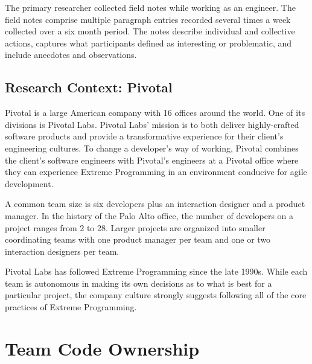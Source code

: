 The primary researcher collected field notes while working as an engineer. The field notes comprise multiple paragraph entries recorded several times a week collected over a six month period. The notes describe individual and collective actions, captures what participants defined as interesting or problematic, and include anecdotes and observations. 

\subsection{Research Context: Pivotal}
\label{ResearchContext}
Pivotal is a large American company with 16 offices around the world. One of its divisions is Pivotal Labs. Pivotal Labs' mission is to both deliver highly-crafted software products and provide a transformative experience for their client's engineering cultures. To change a developer's way of working, Pivotal combines the client's software engineers with Pivotal's engineers at a Pivotal office where they can experience Extreme Programming in an environment conducive for agile development. %

A common team size is six developers plus an interaction designer and a product manager. In the history of the Palo Alto office, the number of developers on a project ranges from 2 to 28. Larger projects are organized into smaller coordinating teams with one product manager per team and one or two interaction designers per team.


Pivotal Labs has followed Extreme Programming \cite{BeckExtremeProgramming2004} since the late 1990s. While each team is autonomous in making its own decisions as to what is best for a particular project, the company culture strongly suggests following all of the core practices of Extreme Programming. %

\section{Team Code Ownership}
\label{TeamCodeOwnership}

